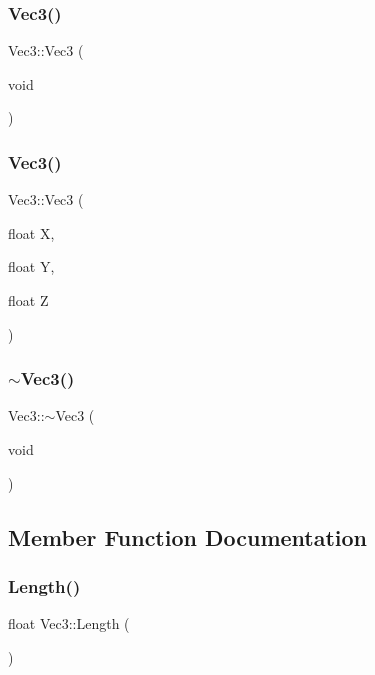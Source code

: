 \subsubsection{\texorpdfstring{Vec3()}{Vec3()}\hspace{0.1cm}{\footnotesize\ttfamily [1/2]}}
{\footnotesize\ttfamily Vec3\+::\+Vec3 (\begin{DoxyParamCaption}\item[{void}]{ }\end{DoxyParamCaption})}

\mbox{\label{classVec3_a770373275bb044b46c334330fa1fc18c}} 
\subsubsection{\texorpdfstring{Vec3()}{Vec3()}\hspace{0.1cm}{\footnotesize\ttfamily [2/2]}}
{\footnotesize\ttfamily Vec3\+::\+Vec3 (\begin{DoxyParamCaption}\item[{float}]{X,  }\item[{float}]{Y,  }\item[{float}]{Z }\end{DoxyParamCaption})}

\mbox{\label{classVec3_a16cba9bda14d7bae1b0eb6509cf88315}} 
\subsubsection{\texorpdfstring{$\sim$\+Vec3()}{~Vec3()}}
{\footnotesize\ttfamily Vec3\+::$\sim$\+Vec3 (\begin{DoxyParamCaption}\item[{void}]{ }\end{DoxyParamCaption})}



\subsection{Member Function Documentation}
\mbox{\label{classVec3_ad4cf0bf3253bcd53454291cc313b8c7b}} 
\subsubsection{\texorpdfstring{Length()}{Length()}}
{\footnotesize\ttfamily float Vec3\+::\+Length (\begin{DoxyParamCaption}{ }\end{DoxyParamCaption})}

